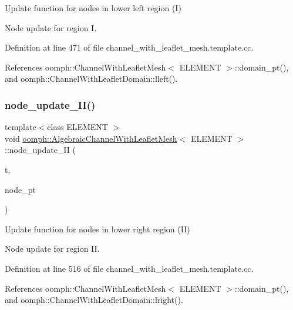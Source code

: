 Update function for nodes in lower left region (I) 

Node update for region I. 

Definition at line 471 of file channel\+\_\+with\+\_\+leaflet\+\_\+mesh.\+template.\+cc.



References oomph\+::\+Channel\+With\+Leaflet\+Mesh$<$ E\+L\+E\+M\+E\+N\+T $>$\+::domain\+\_\+pt(), and oomph\+::\+Channel\+With\+Leaflet\+Domain\+::lleft().

\mbox{\label{classoomph_1_1AlgebraicChannelWithLeafletMesh_aafaeee96d0e7602cc990229abbd9c8fd}} 
\subsubsection{\texorpdfstring{node\+\_\+update\+\_\+\+I\+I()}{node\_update\_II()}}
{\footnotesize\ttfamily template$<$class E\+L\+E\+M\+E\+NT $>$ \\
void \hyperlink{classoomph_1_1AlgebraicChannelWithLeafletMesh}{oomph\+::\+Algebraic\+Channel\+With\+Leaflet\+Mesh}$<$ E\+L\+E\+M\+E\+NT $>$\+::node\+\_\+update\+\_\+\+II (\begin{DoxyParamCaption}\item[{const unsigned \&}]{t,  }\item[{Algebraic\+Node $\ast$\&}]{node\+\_\+pt }\end{DoxyParamCaption})\hspace{0.3cm}{\ttfamily [protected]}}



Update function for nodes in lower right region (II) 

Node update for region II. 

Definition at line 516 of file channel\+\_\+with\+\_\+leaflet\+\_\+mesh.\+template.\+cc.



References oomph\+::\+Channel\+With\+Leaflet\+Mesh$<$ E\+L\+E\+M\+E\+N\+T $>$\+::domain\+\_\+pt(), and oomph\+::\+Channel\+With\+Leaflet\+Domain\+::lright().

\mbox{\label{classoomph_1_1AlgebraicChannelWithLeafletMesh_a5aed6f41b197dc7aab1d5d86b1b7d6d5}} 
